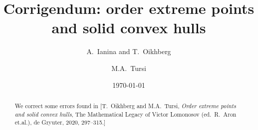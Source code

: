\documentclass[11pt]{amsart}
\theoremstyle{definition}
\begin{document}


\title[Order extreme points]{Corrigendum: order extreme points \\ and solid convex hulls}



\author{A.~Ianina and T.~Oikhberg}

\address{A.I. and T.O.: Dept.~of Mathematics, University of Illinois, Urbana IL 61801, USA}

 \author{M.A.~Tursi}


\address{M.A.T.: Independent researcher}

\date{\today}





\maketitle

\parindent=0pt
\parskip=3pt

\begin{abstract}
We correct some errors found in [T.~Oikhberg and M.A.~Tursi,
{\it Order extreme points and solid convex hulls},
The Mathematical Legacy of Victor Lomonosov (ed.~R.~Aron et.al.), de Gryuter, 2020, 297--315.]
\end{abstract}


\maketitle
\thispagestyle{empty}

\end{document}
